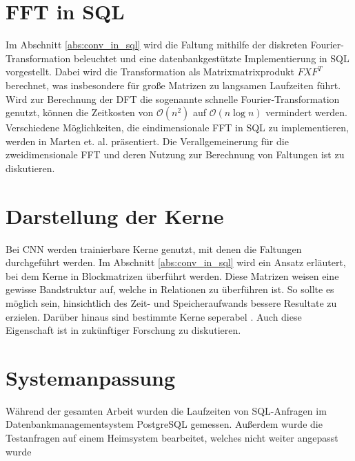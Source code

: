 \section*{FFT in SQL}
Im Abschnitt \ref{abs:conv_in_sql} wird die Faltung mithilfe der diskreten Fourier-Transformation beleuchtet und eine datenbankgestützte Implementierung in SQL vorgestellt. Dabei wird die Transformation als Matrixmatrixprodukt $F X F^T$ berechnet, was insbesondere für große Matrizen zu langsamen Laufzeiten führt. Wird zur Berechnung der DFT die sogenannte schnelle Fourier-Transformation genutzt, können die Zeitkosten von $\mathcal{O}(n^2)$ auf $\mathcal{O}(n \log n)$ vermindert werden. Verschiedene Möglichkeiten, die eindimensionale FFT in SQL zu implementieren, werden in Marten et. al.\cite{DBLP:conf/adbis/Marten0019} präsentiert. Die Verallgemeinerung für die zweidimensionale FFT und deren Nutzung zur Berechnung von Faltungen ist zu diskutieren.

\section*{Darstellung der Kerne}
Bei CNN werden trainierbare Kerne genutzt, mit denen die Faltungen durchgeführt werden. Im Abschnitt \ref{abs:conv_in_sql} wird ein Ansatz erläutert, bei dem Kerne in Blockmatrizen überführt werden. Diese Matrizen weisen eine gewisse Bandstruktur auf, welche in Relationen zu überführen ist. So sollte es möglich sein, hinsichtlich des Zeit- und Speicheraufwands bessere Resultate zu erzielen. Darüber hinaus sind bestimmte Kerne seperabel \cite{}. Auch diese Eigenschaft ist in zukünftiger Forschung zu diskutieren.

\section*{Systemanpassung}
Während der gesamten Arbeit wurden die Laufzeiten von SQL-Anfragen im Datenbankmanagementsystem PostgreSQL gemessen. Außerdem wurde die Testanfragen auf einem Heimsystem bearbeitet, welches nicht weiter angepasst wurde